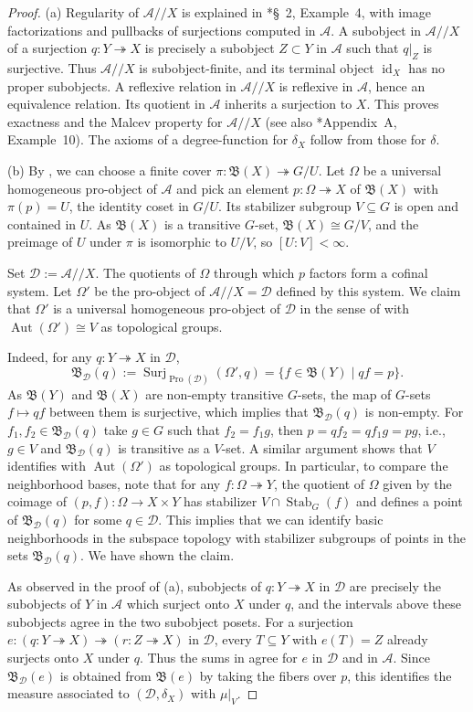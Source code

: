 \documentclass[11pt]{amsart}
\newcommand\Cref[1]{\zcref[S]{#1}}
\theoremstyle{definition}
\theoremstyle{remark}
\newcommand\cA{\mathcal A}
\newcommand\cD{\mathcal D}
\newcommand\fB{\mathfrak B}
\newcommand\id{\operatorname{id}}
\newcommand\Pro{\operatorname{Pro}}
\newcommand\Surj{\operatorname{Surj}}
\newcommand\Aut{\operatorname{Aut}}
\renewcommand\:\colon
\renewcommand\:\colon
\newcommand\tto{\twoheadrightarrow}
\begin{document}
\begin{proof}
    (a) Regularity of $\cA//X$ is explained in \cite{knop}*{\S~2, Example~4}, with image factorizations and pullbacks of surjections computed in $\cA$. A subobject in $\cA//X$ of a surjection $q\:Y\tto X$ is precisely a subobject $Z\subset Y$ in $\cA$ such that $q|_Z$ is surjective. Thus $\cA//X$ is subobject-finite, and its terminal object $\id_X$ has no proper subobjects. A reflexive relation in $\cA//X$ is reflexive in $\cA$, hence an equivalence relation. Its quotient in $\cA$ inherits a surjection to $X$. This proves exactness and the Malcev property for $\cA//X$ (see also \cite{knop}*{Appendix~A, Example~10}). The axioms of a degree-function for $\delta_X$ follow from those for $\delta$.

    (b) By \Cref{p:bx-finite-cover}, we can choose a finite cover $\pi:\fB(X)\tto G/U$. Let $\Omega$ be a universal homogeneous pro-object of $\cA$ and pick an element $p:\Omega\tto X$ of $\fB(X)$ with $\pi(p)=U$, the identity coset in $G/U$. Its stabilizer subgroup $V\subseteq G$ is open and contained in $U$. As $\fB(X)$ is a transitive $G$-set, $\fB(X)\cong G/V$, and the preimage of $U$ under $\pi$ is isomorphic to $U/V$, so $[U:V]<\infty$.

    Set $\cD:=\cA//X$. The quotients of $\Omega$ through which $p$ factors form a cofinal system. Let $\Omega'$ be the pro-object of $\cA//X=\cD$ defined by this system. We claim that $\Omega'$ is a universal homogeneous pro-object of $\cD$ in the sense of \Cref{c:g} with $\Aut(\Omega')\cong V$ as topological groups.
    
    Indeed, for any $q:Y\tto X$ in $\cD$, 
    \[
        \fB_\cD(q):=\Surj_{\Pro(\cD)}(\Omega',q)=\{f\in\fB(Y)\mid q f=p\}.
    \]
    As $\fB(Y)$ and $\fB(X)$ are non-empty transitive $G$-sets, the map of $G$-sets $f\mapsto qf$ between them is surjective, which implies that $\fB_\cD(q)$ is non-empty. For $f_1,f_2\in\fB_\cD(q)$ take $g\in G$ such that $f_2=f_1g$, then $p=q f_2=q f_1 g=pg$, i.e., $g\in V$ and $\fB_\cD(q)$ is transitive as a $V$-set. A similar argument shows that $V$ identifies with $\Aut(\Omega')$ as topological groups. In particular, to compare the neighborhood bases, note that for any $f:\Omega\tto Y$, the quotient of $\Omega$ given by the coimage of $(p,f):\Omega\to X\times Y$ has stabilizer $V\cap\operatorname{Stab}_G(f)$ and defines a point of $\fB_\cD(q)$ for some $q\in\cD$. This implies that we can identify basic neighborhoods in the subspace topology with stabilizer subgroups of points in the sets $\fB_\cD(q)$.
    We have shown the claim.

    As observed in the proof of (a), subobjects of $q:Y\tto X$ in $\cD$ are precisely the subobjects of $Y$ in $\cA$ which surject onto $X$ under $q$, and the intervals above these subobjects agree in the two subobject posets. For a surjection $e:(q:Y\tto X)\tto(r:Z\tto X)$ in $\cD$, every $T\subseteq Y$ with $e(T)=Z$ already surjects onto $X$ under $q$. Thus the sums in \Cref{e:define-mu} agree for $e$ in $\cD$ and in $\cA$. Since $\fB_{\cD}(e)$ is obtained from $\fB(e)$ by taking the fibers over $p$, this identifies the measure associated to $(\cD,\delta_X)$ with $\mu|_V$.
\end{proof}
\end{document}
